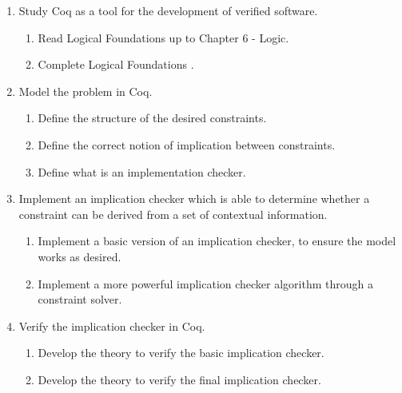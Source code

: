 \begin{enumerate}
    \item Study Coq as a tool for the development of verified software. \\
    \begin{enumerate}[label={1.{\arabic*}.}]
        \item\label{task:1.1} Read Logical Foundations \cite{Pierce2017Logical} up to Chapter 6 - Logic.
        \item\label{task:1.2} Complete Logical Foundations \cite{Pierce2017Logical}.
    \end{enumerate}
    
    \item Model the problem in Coq.
    \begin{enumerate}[label={2.{\arabic*}.}]
        \item\label{task:2.1} Define the structure of the desired constraints.
        \item\label{task:2.2} Define the correct notion of implication between constraints.
        \item\label{task:2.3} Define what is an implementation checker.
    \end{enumerate}
    
    \item Implement an implication checker which is able to determine whether a constraint can be derived from a set of contextual information.
    \begin{enumerate}[label={3.{\arabic*}.}]
        \item\label{task:3.1} Implement a basic version of an implication checker, to ensure the model works as desired.
        \item\label{task:3.2} Implement a more powerful implication checker algorithm through a constraint solver.
    \end{enumerate}
    
    \item Verify the implication checker in Coq.
    \begin{enumerate}[label={4.{\arabic*}.}]
        \item\label{task:4.1} Develop the theory to verify the basic implication checker.
        \item\label{task:4.2} Develop the theory to verify the final implication checker.
    \end{enumerate}
\end{enumerate}

